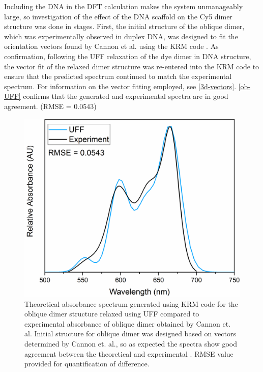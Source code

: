 Including the DNA in the DFT calculation makes the system unmanageably large, so investigation of the effect of the DNA scaffold on the Cy5 dimer structure was done in stages. First, the initial structure of the oblique dimer, which was experimentally observed in duplex DNA, was designed to fit the orientation vectors found by Cannon et al. using the KRM code \cite{Cannon2017}. As confirmation, following the UFF relaxation of the dye dimer in DNA structure, the vector fit of the relaxed dimer structure was re-entered into the KRM code to ensure that the predicted spectrum continued to match the experimental spectrum. For information on the vector fitting employed, see \autoref{3d-vectors}. \autoref{ob-UFF} confirms that the generated and experimental spectra are in good agreement. (RMSE = 0.0543)
\begin{figure}[h!]
    \centering
    \includegraphics[width=0.8\linewidth]{figures/pub1/ob-dimerUFF.pdf}
    \caption{Theoretical absorbance spectrum generated using KRM code for the oblique dimer structure relaxed using UFF compared to experimental absorbance of oblique dimer obtained by Cannon et. al. Initial structure for oblique dimer was designed based on vectors determined by Cannon et. al., so as expected the spectra show good agreement between the theoretical and experimental \cite{Cannon2017}. RMSE value provided for quantification of difference.}\label{ob-UFF}
\end{figure}


